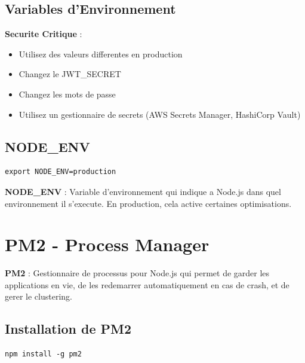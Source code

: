 \documentclass[a4paper,12pt]{book}
\begin{document}
\subsection{Variables d'Environnement}

\begin{warningbox}
    \textbf{Securite Critique} :
    \begin{itemize}
        \item Utilisez des valeurs differentes en production
        \item Changez le JWT\_SECRET
        \item Changez les mots de passe
        \item Utilisez un gestionnaire de secrets (AWS Secrets Manager, HashiCorp Vault)
    \end{itemize}
\end{warningbox}

\subsection{NODE\_ENV}

\begin{lstlisting}[style=bash]
export NODE_ENV=production
\end{lstlisting}

\begin{definitionbox}
    \textbf{NODE\_ENV} : Variable d'environnement qui indique a Node.js dans quel environnement il s'execute. En production, cela active certaines optimisations.
\end{definitionbox}

\section{PM2 - Process Manager}

\begin{definitionbox}
    \textbf{PM2} : Gestionnaire de processus pour Node.js qui permet de garder les applications en vie, de les redemarrer automatiquement en cas de crash, et de gerer le clustering.
\end{definitionbox}

\subsection{Installation de PM2}

\begin{lstlisting}[style=bash]
npm install -g pm2
\end{lstlisting}
\end{document}
